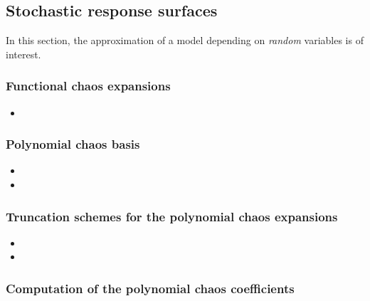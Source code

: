 \subsection{Stochastic response surfaces}

In this section, the approximation of a model depending on \emph{random} variables is of interest.


\subsubsection{Functional chaos expansions}


\begin{itemize}
\item {}
\end{itemize}

\subsubsection{Polynomial chaos basis}

\begin{itemize}
\item {}
\item {}

\end{itemize}

\subsubsection{Truncation schemes for the polynomial chaos expansions}

\begin{itemize}
\item {}
\item {}
\end{itemize}
%



\subsubsection{Computation of the polynomial chaos coefficients}


